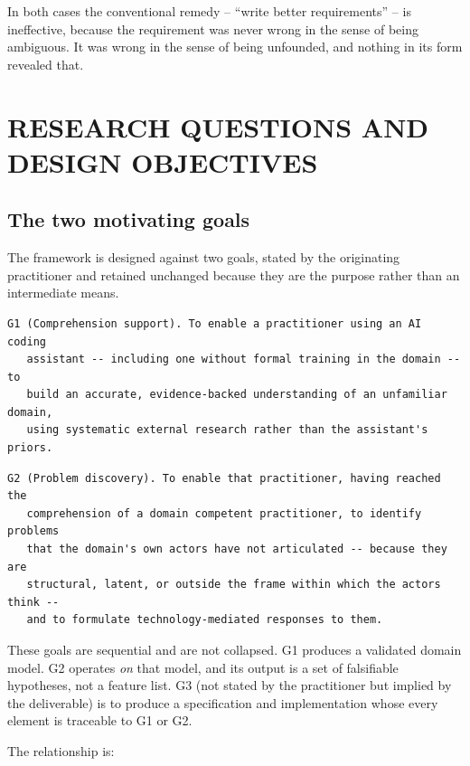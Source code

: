 \documentclass[11pt,a4paper]{article}
\begin{document}
In both cases the conventional remedy -- ``write better requirements'' -- is ineffective, because the requirement was never wrong in the sense of being ambiguous. It was wrong in the sense of being unfounded, and nothing in its form revealed that.

\section{RESEARCH QUESTIONS AND DESIGN OBJECTIVES}

\subsection{The two motivating goals}

The framework is designed against two goals, stated by the originating practitioner and retained unchanged because they are the purpose rather than an intermediate means.

\begin{Verbatim}[fontsize=\footnotesize,breaklines=true,breakanywhere=true,breakautoindent=false,samepage=false]
G1 (Comprehension support). To enable a practitioner using an AI coding
   assistant -- including one without formal training in the domain -- to
   build an accurate, evidence-backed understanding of an unfamiliar domain,
   using systematic external research rather than the assistant's priors.
\end{Verbatim}

\begin{Verbatim}[fontsize=\footnotesize,breaklines=true,breakanywhere=true,breakautoindent=false,samepage=false]
G2 (Problem discovery). To enable that practitioner, having reached the
   comprehension of a domain competent practitioner, to identify problems
   that the domain's own actors have not articulated -- because they are
   structural, latent, or outside the frame within which the actors think --
   and to formulate technology-mediated responses to them.
\end{Verbatim}

These goals are sequential and are not collapsed. G1 produces a validated domain model. G2 operates \emph{on} that model, and its output is a set of falsifiable hypotheses, not a feature list. G3 (not stated by the practitioner but implied by the deliverable) is to produce a specification and implementation whose every element is traceable to G1 or G2.

The relationship is:
\end{document}
